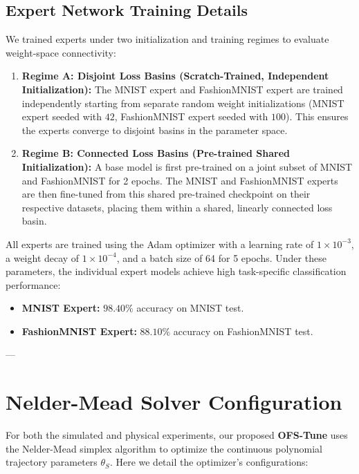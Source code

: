 \subsection{Expert Network Training Details}
We trained experts under two initialization and training regimes to evaluate weight-space connectivity:
\begin{enumerate}
    \item \textbf{Regime A: Disjoint Loss Basins (Scratch-Trained, Independent Initialization):}
    The MNIST expert and FashionMNIST expert are trained independently starting from separate random weight initializations (MNIST expert seeded with $42$, FashionMNIST expert seeded with $100$).
This ensures the experts converge to disjoint basins in the parameter space.
    \item \textbf{Regime B: Connected Loss Basins (Pre-trained Shared Initialization):}
    A base model is first pre-trained on a joint subset of MNIST and FashionMNIST for 2 epochs.
The MNIST and FashionMNIST experts are then fine-tuned from this shared pre-trained checkpoint on their respective datasets, placing them within a shared, linearly connected loss basin.
\end{enumerate}

All experts are trained using the Adam optimizer with a learning rate of $1 \times 10^{-3}$, a weight decay of $1 \times 10^{-4}$, and a batch size of 64 for 5 epochs.
Under these parameters, the individual expert models achieve high task-specific classification performance:
\begin{itemize}
    \item \textbf{MNIST Expert:} $98.40\%$ accuracy on MNIST test.
    \item \textbf{FashionMNIST Expert:} $88.10\%$ accuracy on FashionMNIST test.
\end{itemize}

---

\section{Nelder-Mead Solver Configuration}
\label{app:solver_config}

For both the simulated and physical experiments, our proposed \textbf{OFS-Tune} uses the Nelder-Mead simplex algorithm to optimize the continuous polynomial trajectory parameters $\theta_S$.
Here we detail the optimizer's configurations:

